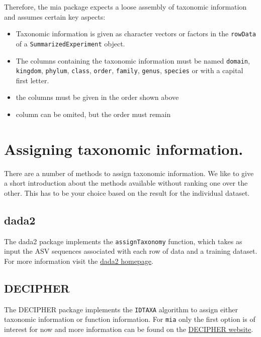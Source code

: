 \documentclass[
]{book}
\providecommand{\tightlist}{%
  \setlength{\itemsep}{0pt}\setlength{\parskip}{0pt}}
\begin{document}
Therefore, the mia package expects a loose assembly of taxonomic information
and assumes certain key aspects:

\begin{itemize}
\tightlist
\item
  Taxonomic information is given as character vectors or factors in the
  \texttt{rowData} of a \texttt{SummarizedExperiment} object.
\item
  The columns containing the taxonomic information must be named \texttt{domain},
  \texttt{kingdom}, \texttt{phylum}, \texttt{class}, \texttt{order}, \texttt{family}, \texttt{genus}, \texttt{species} or with
  a capital first letter.
\item
  the columns must be given in the order shown above
\item
  column can be omited, but the order must remain
\end{itemize}

\hypertarget{assigning-taxonomic-information.}{%
\section{Assigning taxonomic information.}\label{assigning-taxonomic-information.}}

There are a number of methods to assign taxonomic information. We like to give
a short introduction about the methods available without ranking one over the
other. This has to be your choice based on the result for the individual
dataset.

\hypertarget{dada2}{%
\subsection{dada2}\label{dada2}}

The dada2 package \citep{R-dada2} implements the \texttt{assignTaxonomy} function, which
takes as input the ASV sequences associated with each row of data and a training
dataset. For more information visit the
\href{https://benjjneb.github.io/dada2/assign.html}{dada2 homepage}.

\hypertarget{decipher}{%
\subsection{DECIPHER}\label{decipher}}

The DECIPHER package \citep{R-DECIPHER} implements the \texttt{IDTAXA} algorithm to assign
either taxonomic information or function information. For \texttt{mia}
only the first option is of interest for now and more information can be
found on the \href{http://www2.decipher.codes/Classification.html}{DECIPHER website}.
\end{document}
